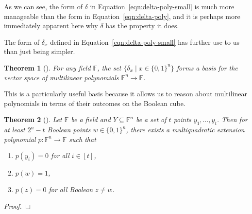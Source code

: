 \documentclass{reedthesis}
\theoremstyle{plain}
\newtheorem{thm}{Theorem}[section]
\theoremstyle{definition}
\theoremstyle{remark}
\numberwithin{equation}{section}
\begin{document}
As we can see, the form of $\delta$ in Equation~\eqref{eqn:delta-poly-small} is much
more manageable than the form in Equation~\eqref{eqn:delta-poly}, and it is
perhaps more immediately apparent here why $\delta$ has the property it does.

The form of $\delta_{x}$ defined in Equation~\eqref{eqn:delta-poly-small} has further
use to us than just being simpler.

\begin{thm}[{\cite[]{AW09}}]
  For any field $\mathbb{F}$, the set $\{\delta_{x} \mid x \in \{0, 1\}^{n}\}$ forms a
  basis for the vector space of multilinear polynomials
  $\mathbb{F}^{n} \rightarrow \mathbb{F}$.
\end{thm}

This is a particularly useful basis because it allows us to reason about
multilinear polynomials in terms of their outcomes on the Boolean cube.

\begin{thm}[{\cite[Theorem 4.3]{AW09}}]
  Let $\mathbb{F}$ be a field and $Y \subseteq \mathbb{F}^{n}$ be a set of $t$ points
  $y_{1}, \ldots, y_{t}$. Then for at least $2^{n} - t$ Boolean points
  $w \in \{0, 1\}^{n}$, there exists a multiquadratic extension polynomial
  $p: \mathbb{F}^{n} \rightarrow \mathbb{F}$ such that
  \begin{enumerate}
    \item $p(y_{i}) = 0$ for all $i \in [t]$,
    \item $p(w) = 1$,
    \item $p(z) = 0$ for all Boolean $z \ne w$.
  \end{enumerate}
\end{thm}

\begin{proof}
\end{proof}
\end{document}

